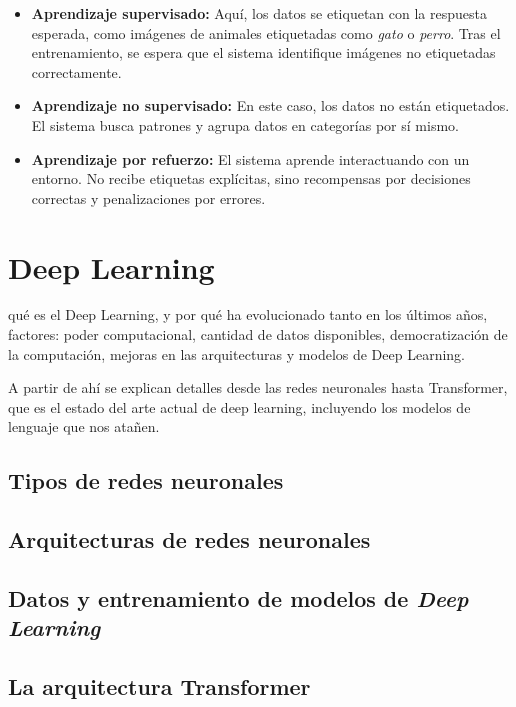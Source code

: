 \begin{itemize}
    \item \textbf{Aprendizaje supervisado:} Aquí, los datos se etiquetan con la respuesta esperada, como imágenes de animales etiquetadas como \textit{gato} o \textit{perro}. Tras el entrenamiento, se espera que el sistema identifique imágenes no etiquetadas correctamente.
    
    \item \textbf{Aprendizaje no supervisado:} En este caso, los datos no están etiquetados. El sistema busca patrones y agrupa datos en categorías por sí mismo.
    
    \item \textbf{Aprendizaje por refuerzo:} El sistema aprende interactuando con un entorno. No recibe etiquetas explícitas, sino recompensas por decisiones correctas y penalizaciones por errores.
\end{itemize}


\section{Deep Learning}

qué es el Deep Learning, y por qué ha evolucionado tanto en los últimos años, factores: poder computacional, cantidad de datos disponibles, democratización de la computación, mejoras en las arquitecturas y modelos de Deep Learning.

A partir de ahí se explican detalles desde las redes neuronales hasta Transformer, que es el estado del arte actual de deep learning, incluyendo los modelos de lenguaje que nos atañen.


\subsection{Tipos de redes neuronales}
\subsection{Arquitecturas de redes neuronales}
\subsection{Datos y entrenamiento de modelos de \textit{Deep Learning}}

\subsection{La arquitectura Transformer}

